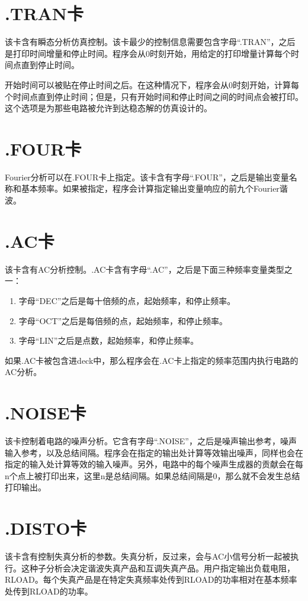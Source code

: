 \section{.TRAN卡}
该卡含有瞬态分析仿真控制。该卡最少的控制信息需要包含字母“.TRAN”，之后是打印时间增量和停止时间。程序会从0时刻开始，用给定的打印增量计算每个时间点直到停止时间。

开始时间可以被贴在停止时间之后。在这种情况下，程序会从0时刻开始，计算每个时间点直到停止时间；但是，只有开始时间和停止时间之间的时间点会被打印。这个选项是为那些电路被允许到达稳态解的仿真设计的。

\section{.FOUR卡}
Fourier分析可以在.FOUR卡上指定。该卡含有字母“.FOUR”，之后是输出变量名称和基本频率。如果被指定，程序会计算指定输出变量响应的前九个Fourier谐波。

\section{.AC卡}
该卡含有AC分析控制。.AC卡含有字母“.AC”，之后是下面三种频率变量类型之一：
\begin{enumerate}
    \item 字母“DEC”之后是每十倍频的点，起始频率，和停止频率。
    \item 字母“OCT”之后是每倍频的点，起始频率，和停止频率。
    \item 字母“LIN”之后是点数，起始频率，和停止频率。
\end{enumerate}
如果.AC卡被包含进deck中，那么程序会在.AC卡上指定的频率范围内执行电路的AC分析。

\section{.NOISE卡}
该卡控制着电路的噪声分析。它含有字母“.NOISE”，之后是噪声输出参考，噪声输入参考，以及总结间隔。程序会在指定的输出处计算等效输出噪声，同样也会在指定的输入处计算等效的输入噪声。另外，电路中的每个噪声生成器的贡献会在每n个点上被打印出来，这里n是总结间隔。如果总结间隔是0，那么就不会发生总结打印输出。

\section{.DISTO卡}
该卡含有控制失真分析的参数。失真分析，反过来，会与AC小信号分析一起被执行。这种子分析会决定谐波失真产品和互调失真产品。用户指定输出负载电阻，RLOAD。每个失真产品是在特定失真频率处传到RLOAD的功率相对在基本频率处传到RLOAD的功率。

